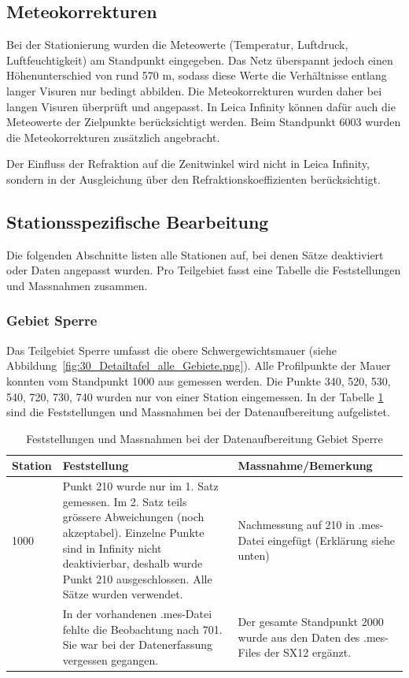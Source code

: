 \subsection{Meteokorrekturen}
\label{sec:meteokorrekturen}
Bei der Stationierung wurden die Meteowerte (Temperatur, Luftdruck, Luftfeuchtigkeit) am Standpunkt eingegeben. Das Netz
überspannt jedoch einen Höhenunterschied von rund 570 m, sodass diese Werte die
Verhältnisse entlang langer Visuren nur bedingt abbilden. Die Meteokorrekturen wurden
daher bei langen Visuren überprüft und angepasst. In Leica Infinity können dafür auch
die Meteowerte der Zielpunkte berücksichtigt werden. Beim Standpunkt 6003 wurden die
Meteokorrekturen zusätzlich angebracht.

Der Einfluss der Refraktion auf die Zenitwinkel wird nicht in Leica Infinity, sondern in der
Ausgleichung über den Refraktionskoeffizienten berücksichtigt.

\subsection{Stationsspezifische Bearbeitung}
\label{sec:stationsspezifische_bearbeitung}
Die folgenden Abschnitte listen alle Stationen auf, bei denen Sätze deaktiviert oder
Daten angepasst wurden. Pro Teilgebiet fasst eine Tabelle die Feststellungen und Massnahmen zusammen. \bigskip

\subsubsection{Gebiet Sperre}
\label{sec:gebiet_sperre}
Das Teilgebiet Sperre umfasst die obere Schwergewichtsmauer (siehe Abbildung~\ref{fig:30_Detailtafel_alle_Gebiete.png}). Alle Profilpunkte
der Mauer konnten vom Standpunkt 1000 aus gemessen werden. Die Punkte 340, 520, 530, 540, 720, 730,
740 wurden nur von einer Station eingemessen. In der Tabelle \ref{tab:feststellungen} sind die
Feststellungen und Massnahmen bei der Datenaufbereitung aufgelistet.

\begin{table}[H]
    \centering
    \begin{tabular}{p{1.5cm} p{6cm} p{5.5cm}}
        \toprule
        Station & Feststellung & Massnahme/Bemerkung \\
        \midrule
        1000 & Punkt 210 wurde nur im 1. Satz gemessen. Im 2. Satz teils
        grössere Abweichungen (noch akzeptabel). Einzelne Punkte sind in
        Infinity nicht deaktivierbar, deshalb wurde Punkt 210 ausgeschlossen.
        Alle Sätze wurden verwendet.
        & Nachmessung auf 210 in .mes-Datei eingefügt (Erklärung siehe unten) \\
        \addlinespace
        2000 & In der vorhandenen .mes-Datei fehlte die Beobachtung nach
        701. Sie war bei der Datenerfassung vergessen gegangen.
        & Der gesamte Standpunkt 2000 wurde aus den Daten des .mes-Files der SX12 ergänzt. \\
        \bottomrule
    \end{tabular}
    \caption{Feststellungen und Massnahmen bei der Datenaufbereitung Gebiet Sperre}
    \label{tab:feststellungen}
\end{table}

